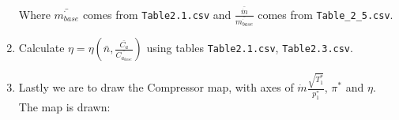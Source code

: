 \documentclass[12pt,english]{article}
\begin{document}
\begin{enumerate}
    Where $\bar{\dot{m_{base}}}$ comes from \verb|Table2.1.csv| and $\frac{\bar{\dot{m}}}{\bar{\dot{m_{base}}}}$ comes from \verb|Table_2_5.csv|. 

    \item Calculate $\eta = \eta (\bar{n}, \frac{\bar{C_{a}}}{\bar{C_{a_{base}}}})$ using tables \verb|Table2.1.csv|, \verb|Table2.3.csv|.
    
    \item Lastly we are to draw the Compressor map, with axes of $\dot{m} \frac{\sqrt{T^{*}_{1}}}{p^{*}_{1}}$, $\pi^{*}$ and $\eta$. The map is drawn:
\end{enumerate}
\end{document}
